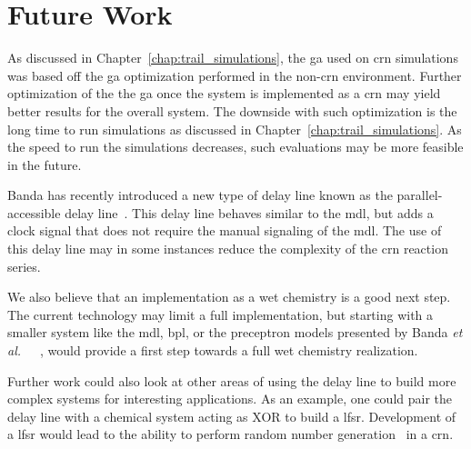 \section{Future Work}
As discussed in Chapter~\ref{chap:trail_simulations}, the \gls{ga} used on \gls{crn} simulations was based off the \gls{ga} optimization performed in the non-\gls{crn} environment. Further optimization of the the \gls{ga} once the system is implemented as a \gls{crn} may yield better results for the overall system. The downside with such optimization is the long time to run simulations as discussed in Chapter~\ref{chap:trail_simulations}. As the speed to run the simulations decreases, such evaluations may be more feasible in the future. 

Banda has recently introduced a new type of delay line known as the parallel-accessible delay line~\cite{Banda2014-pf}. This delay line behaves similar to the \gls{mdl}, but adds a clock signal that does not require the manual signaling of the \gls{mdl}. The use of this delay line may in some instances reduce the complexity of the \gls{crn} reaction series.

We also believe that an implementation as a wet chemistry is a good next step. The current technology may limit a full implementation, but starting with a smaller system like the \gls{mdl}, \gls{bpl}, or the preceptron models presented by Banda \textit{et al.}~\cite{Banda2013-zs}~\cite{Banda2014-bp}~\cite{Banda2014-kg}, would provide a first step towards a full wet chemistry realization.

Further work could also look at other areas of using the delay line to build more complex systems for interesting applications. As an example, one could pair the delay line with a chemical system acting as XOR to build a \gls{lfsr}. Development of a \gls{lfsr} would lead to the ability to perform random number generation~\cite{Chu1999-ms} in a \gls{crn}.





